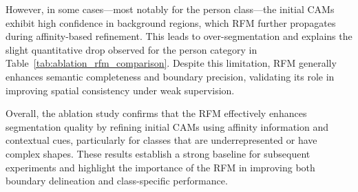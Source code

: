 However, in some cases—most notably for the person class—the initial CAMs exhibit high confidence in background regions, which RFM further propagates during affinity-based refinement. This leads to over-segmentation and explains the slight quantitative drop observed for the person category in Table~\ref{tab:ablation_rfm_comparison}. Despite this limitation, RFM generally enhances semantic completeness and boundary precision, validating its role in improving spatial consistency under weak supervision.

Overall, the ablation study confirms that the RFM effectively enhances segmentation quality by refining initial CAMs using affinity information and contextual cues, particularly for classes that are underrepresented or have complex shapes. These results establish a strong baseline for subsequent experiments and highlight the importance of the RFM in improving both boundary delineation and class-specific performance.
